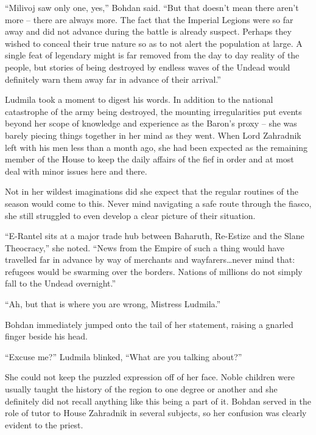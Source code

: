  

“Milivoj saw only one, yes,” Bohdan said. “But that doesn't mean there aren’t more – there are always more. The fact that the Imperial Legions were so far away and did not advance during the battle is already suspect. Perhaps they wished to conceal their true nature so as to not alert the population at large. A single feat of legendary might is far removed from the day to day reality of the people, but stories of being destroyed by endless waves of the Undead would definitely warn them away far in advance of their arrival.”

 

Ludmila took a moment to digest his words. In addition to the national catastrophe of the army being destroyed, the mounting irregularities put events beyond her scope of knowledge and experience as the Baron’s proxy – she was barely piecing things together in her mind as they went. When Lord Zahradnik left with his men less than a month ago, she had been expected as the remaining member of the House to keep the daily affairs of the fief in order and at most deal with minor issues here and there.

 

Not in her wildest imaginations did she expect that the regular routines of the season would come to this. Never mind navigating a safe route through the fiasco, she still struggled to even develop a clear picture of their situation.

 

“E-Rantel sits at a major trade hub between Baharuth, Re-Estize and the Slane Theocracy,” she noted. “News from the Empire of such a thing would have travelled far in advance by way of merchants and wayfarers…never mind that: refugees would be swarming over the borders. Nations of millions do not simply fall to the Undead overnight.”

 

“Ah, but that is where you are wrong, Mistress Ludmila.”

 

Bohdan immediately jumped onto the tail of her statement, raising a gnarled finger beside his head.

 

“Excuse me?” Ludmila blinked, “What are you talking about?”

 

She could not keep the puzzled expression off of her face. Noble children were usually taught the history of the region to one degree or another and she definitely did not recall anything like this being a part of it. Bohdan served in the role of tutor to House Zahradnik in several subjects, so her confusion was clearly evident to the priest.

